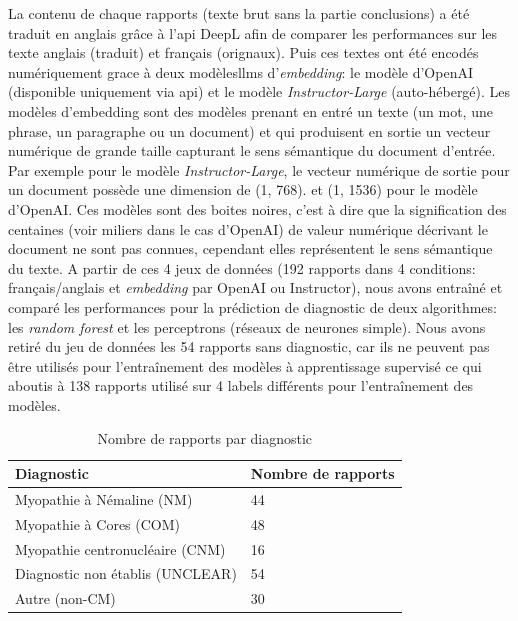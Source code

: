 La contenu de chaque rapports (texte brut sans la partie conclusions) a été traduit en anglais grâce à l'\gls{api}  DeepL afin de comparer les performances sur les texte anglais (traduit) et français (orignaux). Puis ces textes ont été encodés numériquement grace à deux modèles\gls{llms} d'\textit{embedding}: le modèle d'OpenAI (disponible uniquement via \gls{api}) et le modèle \textit{Instructor-Large} (auto-hébergé). Les modèles d'embedding sont des modèles prenant en entré un texte (un mot, une phrase, un paragraphe ou un document) et qui produisent en sortie un vecteur numérique de grande taille capturant le sens sémantique du document d'entrée. Par exemple pour le modèle \textit{Instructor-Large}, le vecteur numérique de sortie pour un document possède une dimension de (1, 768). et (1, 1536) pour le modèle d'OpenAI. Ces modèles sont des boites noires, c'est à dire que la signification des centaines (voir miliers dans le cas d'OpenAI) de valeur numérique décrivant le document ne sont pas connues, cependant elles représentent le sens sémantique du texte.
A partir de ces 4 jeux de données (192 rapports dans 4 conditions: français/anglais et \textit{embedding} par OpenAI ou Instructor), nous avons entraîné et comparé les performances pour la prédiction de diagnostic de deux algorithmes: les \textit{random forest} et les perceptrons (réseaux de neurones simple). Nous avons retiré du jeu de données les 54 rapports sans diagnostic, car ils ne peuvent pas être utilisés pour l'entraînement des modèles à apprentissage supervisé ce qui aboutis à 138 rapports utilisé sur 4 labels différents pour l'entraînement des modèles.
\begin{table}[ht]
\centering
\caption{Nombre de rapports par diagnostic}
\label{tab:number_patients}
\begin{tabularx}{\textwidth}{|X|X|}
\hline
\textbf{Diagnostic} & \textbf{Nombre de rapports} \\
\hline
Myopathie à Némaline (NM) & 44 \\
\hline
Myopathie à Cores (COM) & 48 \\
\hline
Myopathie centronucléaire (CNM) & 16 \\
\hline
Diagnostic non établis  (UNCLEAR) & 54 \\
\hline
Autre (non-CM) & 30 \\
\hline
\end{tabularx}
\end{table}

